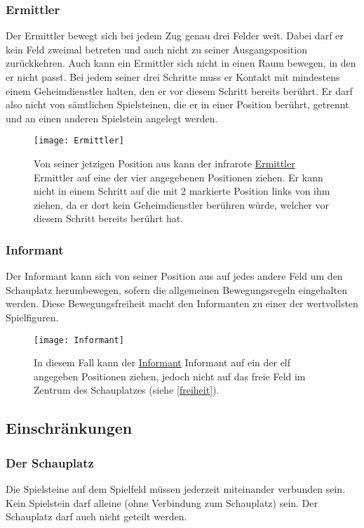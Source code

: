 \documentclass[ngerman, gray]{sdqassignment}
\begin{document}
\subsubsection{Ermittler}
\label{ermittler}
Der Ermittler bewegt sich bei jedem Zug genau drei Felder weit. Dabei darf er kein Feld zweimal betreten und auch nicht zu seiner Ausgangsposition zurückkehren. Auch kann ein Ermittler sich nicht in einen Raum bewegen, in den er nicht passt. Bei jedem seiner drei Schritte muss er Kontakt mit mindestens einem Geheimdienstler halten, den er vor diesem Schritt bereits berührt. Er darf also nicht von sämtlichen Spielsteinen, die er in einer Position berührt, getrennt und an einen anderen Spielstein angelegt werden.

\begin{figure}[ht]
    \centering
    \texttt{[image: Ermittler]}
    \label{fig:ermittler}
    \caption{Von seiner jetzigen Position aus kann der infrarote \hyperref[ermittler]{Ermittler} Ermittler auf eine der vier angegebenen Positionen ziehen. Er kann nicht in einem Schritt auf die mit 2 markierte Position links von ihm ziehen, da er dort kein Geheimdienstler berühren würde, welcher vor diesem Schritt bereits berührt hat.}
\end{figure}

\subsubsection{Informant}
\label{informant}
Der Informant kann sich von seiner Position aus auf jedes andere Feld um den Schauplatz herumbewegen, sofern die allgemeinen Bewegungsregeln eingehalten werden. Diese Bewegungsfreiheit macht den Informanten zu einer der wertvollsten Spielfiguren.

\begin{figure}[ht]
    \centering
    \texttt{[image: Informant]}
    \label{fig:informant}
    \caption{In diesem Fall kann der \hyperref[informant]{Informant} Informant auf ein der elf angegeben Positionen ziehen, jedoch nicht auf das freie Feld im Zentrum des Schauplatzes (siehe \cref{freiheit}).}
\end{figure}

\subsection{Einschränkungen}
\subsubsection{Der Schauplatz}
Die Spielsteine auf dem Spielfeld müssen jederzeit miteinander verbunden sein. Kein Spielstein darf alleine (ohne Verbindung zum Schauplatz) sein. Der Schauplatz darf auch nicht geteilt werden.
\end{document}
